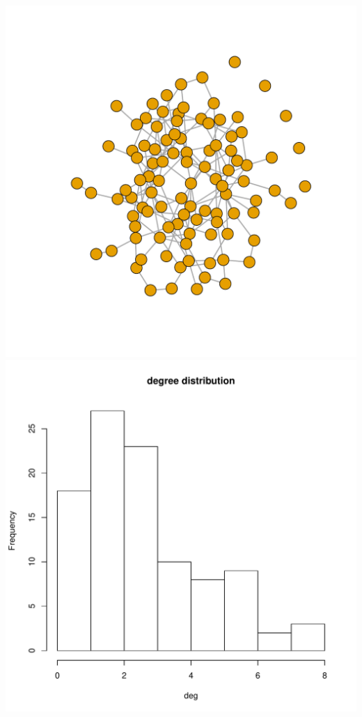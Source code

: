 \documentclass[compress,10pt]{beamer}
\begin{document}
\begin{frame}
\begin{center}
 \includegraphics[scale=.3]{plots/ER.pdf} \includegraphics[scale=.3]{plots/degER.pdf}
\end{center}


\end{frame}
\end{document}
